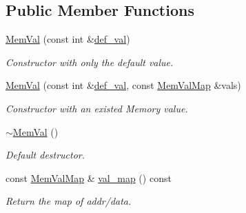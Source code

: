 \subsection*{Public Member Functions}
\begin{DoxyCompactItemize}
\item 
\mbox{\label{classilang_1_1_mem_val_a2c2ed22e99a5289cc3e3d0b942e4a744}} 
\mbox{\hyperlink{classilang_1_1_mem_val_a2c2ed22e99a5289cc3e3d0b942e4a744}{Mem\+Val}} (const int \&\mbox{\hyperlink{classilang_1_1_mem_val_a6ef1149c0c760c669ba4e3b99effbb73}{def\+\_\+val}})
\begin{DoxyCompactList}\small\item\em Constructor with only the default value. \end{DoxyCompactList}\item 
\mbox{\label{classilang_1_1_mem_val_abd57625adc5c3f7a19ffec4337a5da5f}} 
\mbox{\hyperlink{classilang_1_1_mem_val_abd57625adc5c3f7a19ffec4337a5da5f}{Mem\+Val}} (const int \&\mbox{\hyperlink{classilang_1_1_mem_val_a6ef1149c0c760c669ba4e3b99effbb73}{def\+\_\+val}}, const \mbox{\hyperlink{classilang_1_1_mem_val_aea3cddbc760f2e143d02cdfab66e6b36}{Mem\+Val\+Map}} \&vals)
\begin{DoxyCompactList}\small\item\em Constructor with an existed Memory value. \end{DoxyCompactList}\item 
\mbox{\label{classilang_1_1_mem_val_aa965d6652b50f447b0b08e34ec0d3f66}} 
\mbox{\hyperlink{classilang_1_1_mem_val_aa965d6652b50f447b0b08e34ec0d3f66}{$\sim$\+Mem\+Val}} ()
\begin{DoxyCompactList}\small\item\em Default destructor. \end{DoxyCompactList}\item 
\mbox{\label{classilang_1_1_mem_val_a2a4a8f9b67a9595a7b46e9848b2b9b65}} 
const \mbox{\hyperlink{classilang_1_1_mem_val_aea3cddbc760f2e143d02cdfab66e6b36}{Mem\+Val\+Map}} \& \mbox{\hyperlink{classilang_1_1_mem_val_a2a4a8f9b67a9595a7b46e9848b2b9b65}{val\+\_\+map}} () const
\begin{DoxyCompactList}\small\item\em Return the map of addr/data. \end{DoxyCompactList}\item 

\end{DoxyCompactItemize}
